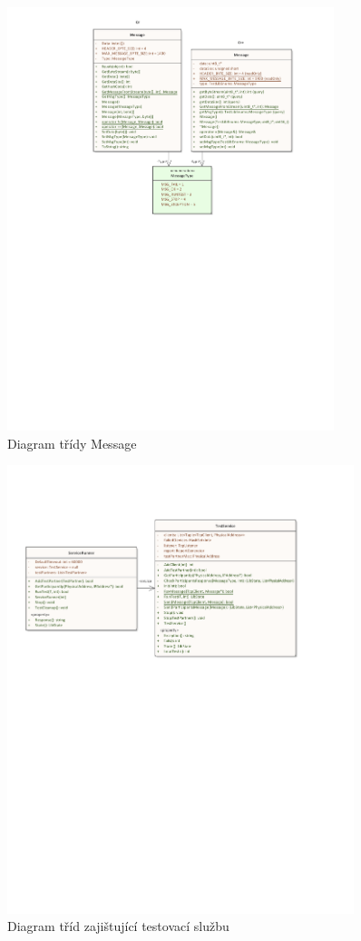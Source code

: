 \begin{figure}[H]
    \centering 
    \includegraphics[width=0.85\textwidth]{assets/img/class_diagram/message.pdf}
    \caption{Diagram třídy Message}
    \label{fig:message_class}
\end{figure}

\begin{figure}[H]
    \centering 
    \includegraphics[width=0.90\textwidth]{assets/img/class_diagram/service.pdf}
    \caption{Diagram tříd zajištující testovací službu}
    \label{fig:test_service}
\end{figure}

